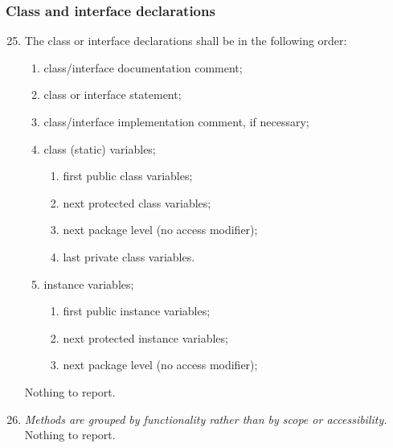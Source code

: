 	\subsubsection{Class and interface declarations}
		\begin{enumerate}
			\setcounter{enumi}{24}
			\item \begin{itshape}
				The class or interface declarations shall be in the following order:
				\begin{enumerate}[label={(\alph*)}]
					\item class/interface documentation comment;
					\item class or interface statement;
					\item class/interface implementation comment, if necessary;
					\item class (static) variables;
						\begin{enumerate}[label=\roman*]
							\item first public class variables;
							\item next protected class variables;
							\item next package level (no access modifier);
							\item last private class variables.
						\end{enumerate}
					\item instance variables;
						\begin{enumerate}[label=\roman*]
							\item first public instance variables;
							\item next protected instance variables;
							\item next package level (no access modifier);
						\end{enumerate}
				\end{enumerate}
			\end{itshape}
			Nothing to report. %

			\item \textit{Methods are grouped by functionality rather than by scope or accessibility.}\newline
			Nothing to report. %


\end{enumerate}
